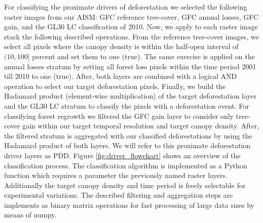 			For classifying the proximate drivers of deforestation we selected the following raster images from our \ac{AISM}: \ac{GFC} reference tree-cover, \ac{GFC} annual losses, \ac{GFC} gain, and the \ac{GL30} \ac{LC} classification of 2010. Now, we apply to each raster image stack the following described operations. From the reference tree-cover images, we select all pixels where the canopy density is within the half-open interval of $(10,100]$ percent and set them to one (true). The same exercise is applied on the annual losses stratum by setting all forest loss pixels within the time period 2001 till 2010 to one (true). After, both layers are combined with a logical AND operation to select our target deforestation pixels. Finally, we build the Hadamard product (element-wise multiplication) of the target deforestation layer and the \ac{GL30} \ac{LC} stratum to classify the pixels with a deforestation event. For classifying forest regrowth we filtered the \ac{GFC} gain layer to consider only tree-cover gain within our target temporal resolution and target canopy density. After, the filtered stratum is aggregated with our classified deforestations by using the Hadamard product of both layers. We will refer to this proximate deforestation driver layers as PDD. Figure \ref{fig:driver_flowchart} shows an overview of the classification process. The classification algorithm is implemented as a Python function which requires a parameter the previously named raster layers. Additionally the target canopy density and time period is freely selectable for experimental variations. The described filtering and aggregation steps are implements as binary matrix operations for fast processing of large data sizes by means of numpy.
